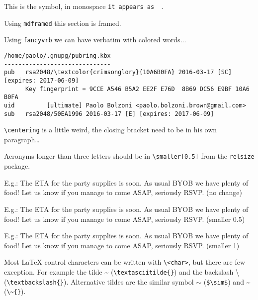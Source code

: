 \documentclass[a4paper]{article}
\newcommand\ifmonospace{\ifdim\fontdimen3\font=0pt }
\newcommand\Cpp{%
\ifmonospace%
    C++%
\else%
    C\kern-.1667em\raise.30ex\hbox{\smaller{++}}%
\fi%
\spacefactor1000 }
\begin{document}
This is the \Cpp{} symbol, in monospace \texttt{it appears as \Cpp{}}.

\vskip5mm
\begin{mdframed}[hidealllines=true,backgroundcolor=black!10]
Using \texttt{mdframed} this section is framed.

\blindtext
\end{mdframed}

\vskip5mm
Using \texttt{fancyvrb} we can have verbatim with colored words...
\begin{Verbatim}[commandchars=\\\{\}]
% gpg --fingerprint
/home/paolo/.gnupg/pubring.kbx
------------------------------
pub   rsa2048/\textcolor{crimsonglory}{10A6B0FA} 2016-03-17 [SC] [expires: 2017-06-09]
      Key fingerprint = 9CCE A546 B5A2 EE2F E76D  8B69 DC56 E9BF 10A6 B0FA
uid         [ultimate] Paolo Bolzoni <paolo.bolzoni.brown@gmail.com>
sub   rsa2048/50EA1996 2016-03-17 [E] [expires: 2017-06-09]
\end{Verbatim}

\vskip5mm
\texttt{\textbackslash{}centering} is a little weird, the closing bracket need to be
in his own paragraph\ldots

{\centering
\blindtext

}

\vskip5mm
Acronyms longer than three letters should be in \texttt{\textbackslash{}smaller[0.5]} from the
\texttt{relsize} package.

E.g.: The ETA for the party supplies is soon. As usual BYOB we have
plenty of food!  Let us know if you manage to come ASAP, seriously
RSVP. (no change)

E.g.: The ETA for the party supplies is soon. As usual {\smaller[0.5]BYOB} we have
plenty of food!  Let us know if you manage to come {\smaller[0.5]ASAP}, seriously
{\smaller[0.5]RSVP}. (smaller 0.5)

E.g.: The ETA for the party supplies is soon. As usual {\smaller BYOB} we have
plenty of food!  Let us know if you manage to come {\smaller ASAP}, seriously
{\smaller RSVP}. (smaller 1)


\vskip5mm
Most \LaTeX{} control characters can be written with
\texttt{\textbackslash{}<char>}, but there are few exception. For example the
tilde \textasciitilde{} (\texttt{\textbackslash{}textasciitilde\{\}}) and the
backslash \textbackslash{} (\texttt{\textbackslash{}textbackslash\{\}}).
Alternative tildes are the similar symbol $\sim$
(\texttt{\$\textbackslash{}sim\$}) and \~{}
(\texttt{\textbackslash{}\textasciitilde{}\{\}}).
\end{document}
